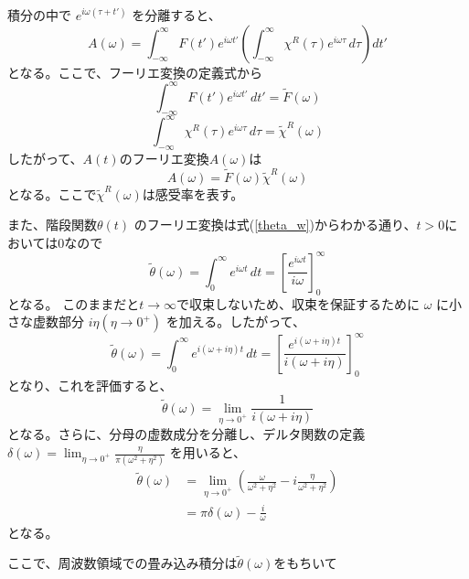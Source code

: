 \documentclass[11pt,a4j]{jreport}
\begin{document}
積分の中で $e^{i \omega (\tau + t')}$ を分離すると、
\begin{equation}
  A(\omega)= \int_{-\infty}^{\infty} F(t') e^{i \omega t'} \left( \int_{-\infty}^{\infty} \chi^R(\tau) e^{i \omega \tau} \, d\tau \right) dt'
\end{equation}
となる。ここで、フーリエ変換の定義式から
\begin{equation}
  \int_{-\infty}^{\infty} F(t') e^{i \omega t'} \, dt' = \tilde{F}(\omega)
\end{equation}
\begin{equation}
  \int_{-\infty}^{\infty} \chi^R(\tau) e^{i \omega \tau} \, d\tau = \tilde{\chi}^R(\omega)
\end{equation}
したがって、$A(t)$のフーリエ変換$A(\omega)$は
\begin{equation}
  A(\omega)= \tilde{F}(\omega) \tilde{\chi}^R(\omega)
\end{equation}
となる。ここで$\tilde{\chi}^R(\omega)$は感受率を表す。\par
また、階段関数$\theta(t)$ のフーリエ変換は式(\ref{theta_w})からわかる通り、$t>0$においては$0$なので
\begin{equation}
  \tilde{\theta}(\omega) = \int_{0}^{\infty} e^{i \omega t} \, dt = \left[ \frac{e^{i \omega t}}{i \omega} \right]_{0}^{\infty}
\end{equation}
となる。
このままだと$t \to \infty$で収束しないため、収束を保証するために $\omega$ に小さな虚数部分 $i \eta(\eta \to 0^+)$ を加える。したがって、
\begin{equation}
  \tilde{\theta}(\omega) = \int_{0}^{\infty} e^{i (\omega + i \eta) t} \, dt = \left[ \frac{e^{i (\omega + i \eta) t}}{i (\omega + i \eta)} \right]_{0}^{\infty}
\end{equation}
となり、これを評価すると、
\begin{equation}
  \tilde{\theta}(\omega) = \lim_{\eta \to 0^+} \frac{1}{i (\omega + i \eta)}
\end{equation}
となる。さらに、分母の虚数成分を分離し、デルタ関数の定義 $\delta(\omega) = \lim_{\eta \to 0^+} \frac{\eta}{\pi (\omega^2 + \eta^2)}$ を用いると、
\begin{align}
  \tilde{\theta}(\omega) &= \lim_{\eta \to 0^+} \left( \frac{\omega}{\omega^2 + \eta^2} - i \frac{\eta}{\omega^2 + \eta^2} \right)\\
  &= \pi \delta(\omega) - \frac{i}{\omega}
  \label{theta_omega1}
\end{align}
となる。\par
ここで、周波数領域での畳み込み積分は$\tilde{\theta}(\omega)$をもちいて
\end{document}
